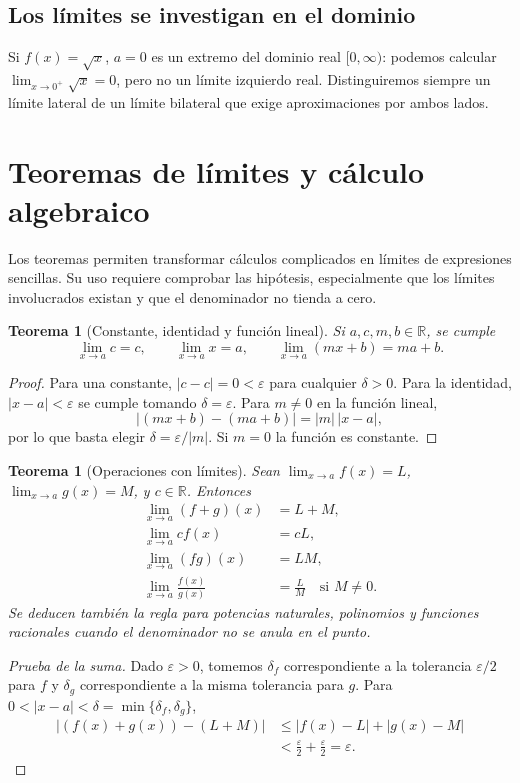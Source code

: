 \documentclass[12pt]{article}
\newtheorem{teorema}[definicion]{Teorema}
\theoremstyle{remark}
\newcommand{\R}{\mathbb{R}}
\begin{document}
\subsection*{Los límites se investigan en el dominio}
Si $f(x)=\sqrt{x}$, $a=0$ es un extremo del dominio real $[0,\infty)$: podemos calcular $\lim_{x\to0^+}\sqrt{x}=0$, pero no un límite izquierdo real. Distinguiremos siempre un límite lateral de un límite bilateral que exige aproximaciones por ambos lados.


\section{Teoremas de límites y cálculo algebraico}
Los teoremas permiten transformar cálculos complicados en límites de expresiones sencillas. Su uso requiere comprobar las hipótesis, especialmente que los límites involucrados existan y que el denominador no tienda a cero.

\begin{teorema}[Constante, identidad y función lineal]
Si $a,c,m,b\in\R$, se cumple
\[
 \lim_{x\to a}c=c,\qquad \lim_{x\to a}x=a,\qquad
 \lim_{x\to a}(mx+b)=ma+b.
\]
\end{teorema}
\begin{proof}
Para una constante, $|c-c|=0<\varepsilon$ para cualquier $\delta>0$. Para la identidad, $|x-a|<\varepsilon$ se cumple tomando $\delta=\varepsilon$. Para $m\ne0$ en la función lineal,
\[
 |(mx+b)-(ma+b)|=|m|\,|x-a|,
\]
por lo que basta elegir $\delta=\varepsilon/|m|$. Si $m=0$ la función es constante.
\end{proof}

\begin{teorema}[Operaciones con límites]
Sean $\lim_{x\to a}f(x)=L$, $\lim_{x\to a}g(x)=M$, y $c\in\R$. Entonces
\begin{align*}
 \lim_{x\to a}(f+g)(x)&=L+M,\\
 \lim_{x\to a}cf(x)&=cL,\\
 \lim_{x\to a}(fg)(x)&=LM,\\
 \lim_{x\to a}\frac{f(x)}{g(x)}&=\frac LM\quad\text{si }M\ne0.
\end{align*}
Se deducen también la regla para potencias naturales, polinomios y funciones racionales cuando el denominador no se anula en el punto.
\end{teorema}

\begin{proof}[Prueba de la suma]
Dado $\varepsilon>0$, tomemos $\delta_f$ correspondiente a la tolerancia $\varepsilon/2$ para $f$ y $\delta_g$ correspondiente a la misma tolerancia para $g$. Para $0<|x-a|<\delta=\min\{\delta_f,\delta_g\}$,
\begin{align*}
 |(f(x)+g(x))-(L+M)|&\le|f(x)-L|+|g(x)-M|\\
 &<\frac\varepsilon2+\frac\varepsilon2=\varepsilon.
\end{align*}
\end{proof}
\end{document}
